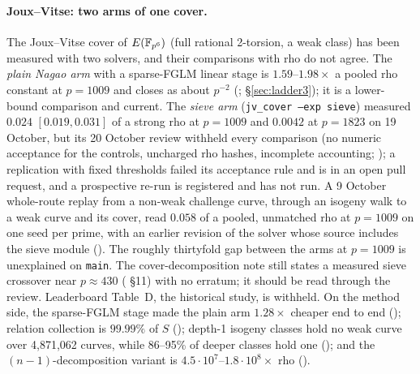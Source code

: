 \paragraph{Joux--Vitse: two arms of one cover.} The Joux--Vitse cover of
$E(\mathbb{F}_{p^6})$ (full rational 2-torsion, a weak class) has been measured
with two solvers, and their comparisons with rho do not agree. The
\emph{plain Nagao arm} with a sparse-FGLM linear stage is $1.59$--$1.98\times$
a pooled rho constant at $p=1009$ and closes as about $p^{-2}$
(; \S\ref{sec:ladder3}); it is a
lower-bound comparison and current. The \emph{sieve arm}
(\texttt{jv\_cover --exp sieve}) measured $0.024$ $[0.019,0.031]$ of a strong
rho at $p=1009$ and $0.0042$ at $p=1823$ on 19 October, but its 20 October
review withheld every comparison (no numeric acceptance for the controls,
uncharged rho hashes, incomplete accounting;
); a replication with fixed
thresholds failed its acceptance rule and is in an open pull request, and a
prospective re-run is registered and has not run. A 9 October whole-route
replay from a non-weak challenge curve, through an isogeny walk to a weak
curve and its cover, read $0.058$ of a pooled, unmatched rho at $p=1009$ on
one seed per prime, with an earlier revision of the solver whose source
includes the sieve module ().
The roughly thirtyfold gap between the arms at $p=1009$ is unexplained on
\texttt{main}. The cover-decomposition note still states a measured sieve
crossover near $p\approx430$
(
\S11) with no erratum; it should be read through the review. Leaderboard
Table~D, the historical study, is withheld. On the method side, the
sparse-FGLM stage made the plain arm $1.28\times$ cheaper end to end
(); relation collection is
$99.99\%$ of $S$ (); depth-1 isogeny
classes hold no weak curve over 4{,}871{,}062 curves, while 86--95\% of
deeper classes hold one (); and
the $(n-1)$-decomposition variant is $4.5\cdot10^7$--$1.8\cdot10^8\times$
rho ().

